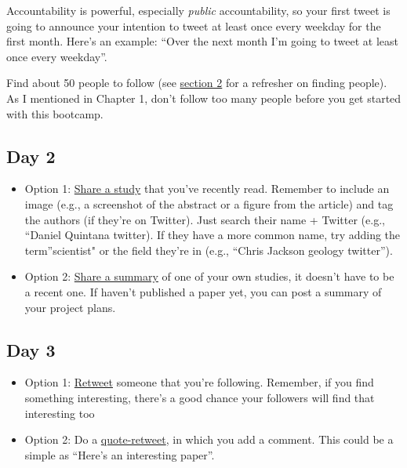 \documentclass[
]{book}
\providecommand{\tightlist}{%
  \setlength{\itemsep}{0pt}\setlength{\parskip}{0pt}}
\begin{document}
Accountability is powerful, especially \emph{public} accountability, so your first tweet is going to announce your intention to tweet at least once every weekday for the first month. Here's an example: ``Over the next month I'm going to tweet at least once every weekday''.

Find about 50 people to follow (see \protect\hyperlink{beginner}{section 2} for a refresher on finding people). As I mentioned in Chapter 1, don't follow too many people before you get started with this bootcamp.

\hypertarget{day-2}{%
\subsection*{Day 2}\label{day-2}}

\begin{itemize}
\tightlist
\item
  Option 1: \protect\hyperlink{composing}{Share a study} that you've recently read. Remember to include an image (e.g., a screenshot of the abstract or a figure from the article) and tag the authors (if they're on Twitter). Just search their name + Twitter (e.g., ``Daniel Quintana twitter). If they have a more common name, try adding the term''scientist" or the field they're in (e.g., ``Chris Jackson geology twitter'').
\item
  Option 2: \protect\hyperlink{composing}{Share a summary} of one of your own studies, it doesn't have to be a recent one. If haven't published a paper yet, you can post a summary of your project plans.
\end{itemize}

\hypertarget{day-3}{%
\subsection*{Day 3}\label{day-3}}

\begin{itemize}
\tightlist
\item
  Option 1: \protect\hyperlink{beginner}{Retweet} someone that you're following. Remember, if you find something interesting, there's a good chance your followers will find that interesting too
\item
  Option 2: Do a \protect\hyperlink{beginner}{quote-retweet}, in which you add a comment. This could be a simple as ``Here's an interesting paper''.
\end{itemize}
\end{document}
